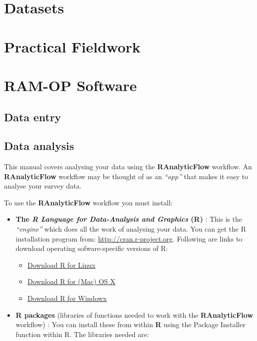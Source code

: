 \documentclass[12pt,]{book}
\theoremstyle{definition}
\theoremstyle{definition}
\theoremstyle{definition}
\theoremstyle{remark}
\begin{document}
\hypertarget{datasets}{%
\chapter{Datasets}\label{datasets}}

\hypertarget{practical}{%
\chapter{Practical Fieldwork}\label{practical}}

\hypertarget{software}{%
\chapter{RAM-OP Software}\label{software}}

\hypertarget{data-entry}{%
\section{Data entry}\label{data-entry}}

\hypertarget{data-analysis}{%
\section{Data analysis}\label{data-analysis}}

This manual covers analysing your data using the \textbf{RAnalyticFlow}
workflow. An \textbf{RAnalyticFlow} workflow may be thought of as an
\emph{``app''} that makes it easy to analyse your survey data.

To use the \textbf{RAnalyticFlow} workflow you must install:

\begin{itemize}
\item
  \textbf{The \emph{R Language for Data-Analysis and Graphics} (R)} :
  This is the \emph{``engine''} which does all the work of analysing
  your data. You can get the R installation program from:
  \url{http://cran.r-project.org}. Following are links to download
  operating sofware-specific versions of R:

  \begin{itemize}
  \item
    \href{https://cran.r-project.org/bin/linux/}{Download R for Linux}
  \item
    \href{https://cran.r-project.org/bin/macosx/}{Download R for (Mac)
    OS X}
  \item
    \href{https://cran.r-project.org/bin/windows/}{Download R for
    Windowx}
  \end{itemize}
\item
  \textbf{R packages} (libraries of functions needed to work with the
  \textbf{RAnalyticFlow} workflow) : You can install these from within
  \textbf{R} using the Package Installer function within R. The
  libraries needed are:
\end{itemize}
\end{document}
